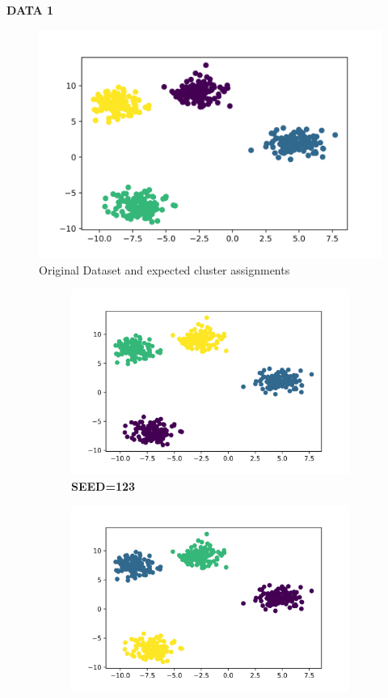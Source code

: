 \documentclass[11pt]{article}
\begin{document}
\bigskip
{\large \textbf{DATA 1}}%
\begin{figure}[htbp!]
    \centering
    \includegraphics[width=0.55\linewidth]{d1.png}
    \caption{Original Dataset and expected cluster assignments}
\end{figure}
\vspace*{-0.7cm}
\begin{figure}[htbp!]
    \begin{subfigure}{0.33\linewidth}
        \centering
        \includegraphics[width=1\linewidth]{d1_123.png}
        \caption{\textbf{SEED=123}}
    \end{subfigure}%
    \begin{subfigure}{0.33\linewidth}
        \centering
        \includegraphics[width=1\linewidth]{d1_53641.png}

\end{subfigure}
\end{figure}
\end{document}
